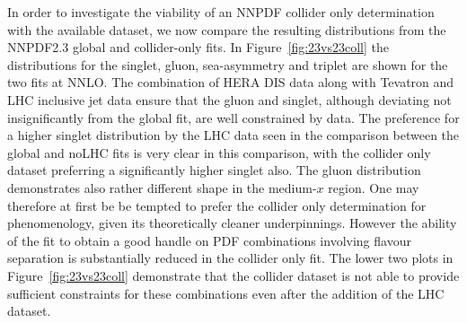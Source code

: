 In order to investigate the viability of an NNPDF collider only determination with the available dataset, we now compare the resulting distributions from the NNPDF2.3 global and collider-only fits. In Figure~\ref{fig:23vs23coll} the distributions for the singlet, gluon, sea-asymmetry and triplet are shown for the two fits at NNLO. The combination of HERA DIS data along with Tevatron and LHC inclusive jet data ensure that the gluon and singlet, although deviating not insignificantly from the global fit, are well constrained by data. The preference for a higher singlet distribution by the LHC data seen in the comparison between the global and noLHC fits is very clear in this comparison, with the collider only dataset preferring a significantly higher singlet also. The gluon distribution demonstrates also rather different shape in the medium-$x$ region. One may therefore at first be be tempted to prefer the collider only determination for phenomenology, given its theoretically cleaner underpinnings. However the ability of the fit to obtain a good handle on PDF combinations involving flavour separation is substantially reduced in the collider only fit. The lower two plots in Figure~\ref{fig:23vs23coll} demonstrate that the collider dataset is not able to provide sufficient constraints for these combinations even after the addition of the LHC dataset.


